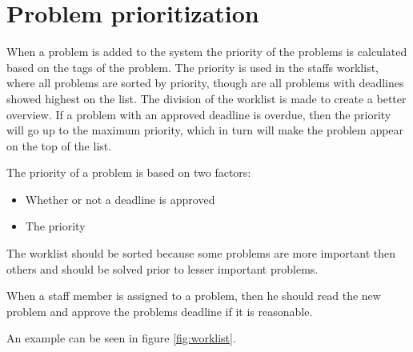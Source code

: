 \section{Problem prioritization}
\label{sec:problem_priority}

When a problem is added to the system the priority of the problems is calculated based on the tags of the problem. The priority is used in the staffs worklist, where all problems are sorted by priority, though are all problems with deadlines showed highest on the list. The division of the worklist is made to create a better overview. If a problem with an approved deadline is overdue, then the priority will go up to the maximum priority, which in turn will make the problem appear on the top of the list.
 
The priority of a problem is based on two factors:


\begin{itemize}
	\item Whether or not a deadline is approved
	\item The priority
\end{itemize}

The worklist should be sorted because some problems are more important then others and should be solved prior to lesser important problems. 

When a staff member is assigned to a problem, then he should read the new problem and approve the problems deadline if it is reasonable. 



An example can be seen in figure \ref{fig:worklist}.